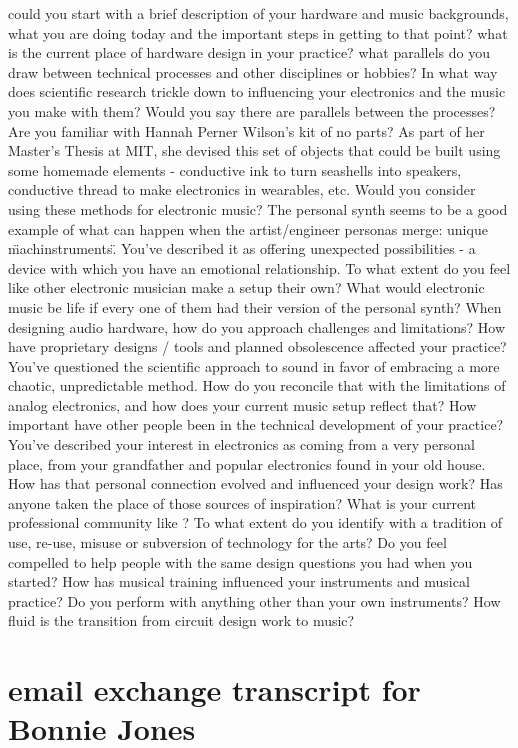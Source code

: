 could you start with a brief description of your hardware and music backgrounds, what you are doing today and the important steps in getting to that point? 
what is the current place of hardware design in your practice? 
what parallels do you draw between technical processes and other disciplines or hobbies? 
In what way does scientific research trickle down to influencing your electronics and the music you make with them? Would you say there are parallels between the processes? 
Are you familiar with Hannah Perner Wilson’s kit of no parts? As part of her Master’s Thesis at MIT, she devised this set of objects that could be built using some homemade elements - conductive ink to turn seashells into speakers, conductive thread to make electronics in wearables, etc. Would you consider using these methods for electronic music? 
The personal synth seems to be a good example of what can happen when the artist/engineer personas merge: unique \"machinstruments\". You've described it as offering unexpected possibilities - a device with which you have an emotional relationship. To what extent do you feel like other electronic musician make a setup their own? 
What would electronic music be life if every one of them had their version of the personal synth? 
When designing audio hardware, how do you approach challenges and limitations?
How have proprietary designs / tools and planned obsolescence affected your practice?
You've questioned the scientific approach to sound in favor of embracing a more chaotic, unpredictable method. How do you reconcile that with the limitations of analog electronics, and how does your current music setup reflect that? 
How important have other people been in the technical development of your practice? 
You've described your interest in electronics as coming from a very personal place, from your grandfather and popular electronics found in your old house. How has that personal connection evolved and influenced your design work? Has anyone taken the place of those sources of inspiration? 
What is your current professional community like ? 
To what extent do you identify with a tradition of use, re-use, misuse or subversion of technology for the arts? 
Do you feel compelled to help people with the same design questions you had when you started? 
How has musical training influenced your instruments and musical practice? 
Do you perform with anything other than your own instruments? 
How fluid is the transition from circuit design work to music?  

\section{email exchange transcript for Bonnie Jones}

